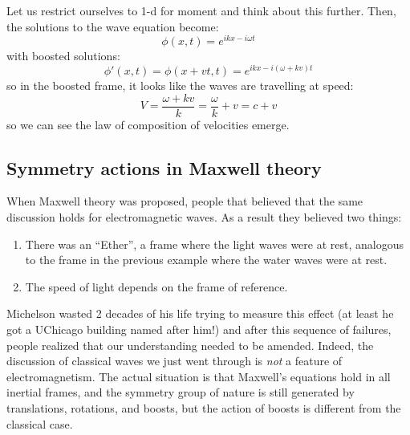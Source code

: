 Let us restrict ourselves to 1-d for moment and think about this further. Then, the solutions to the wave equation become:
\begin{equation}
    \phi(x, t) = e^{ikx - i\omega t}
\end{equation}
with boosted solutions:
\begin{equation}
    \phi'(x, t) = \phi(x + vt, t) = e^{ikx - i(\omega + kv)t}
\end{equation}
so in the boosted frame, it looks like the waves are travelling at speed:
\begin{equation}
    V = \frac{\omega + kv}{k} = \frac{\omega}{k} + v = c + v
\end{equation}
so we can see the law of composition of velocities emerge.

\subsection{Symmetry actions in Maxwell theory}
When Maxwell theory was proposed, people that believed that the same discussion holds for electromagnetic waves. As a result they believed two things:
\begin{enumerate}
    \item There was an ``Ether'', a frame where the light waves were at rest, analogous to the frame in the previous example where the water waves were at rest.
    \item The speed of light depends on the frame of reference.
\end{enumerate}
Michelson wasted 2 decades of his life trying to measure this effect (at least he got a UChicago building named after him!) and after this sequence of failures, people realized that our understanding needed to be amended. Indeed, the discussion of classical waves we just went through is \emph{not} a feature of electromagnetism. The actual situation is that Maxwell's equations hold in all inertial frames, and the symmetry group of nature is still generated by translations, rotations, and boosts, but the action of boosts is different from the classical case.

